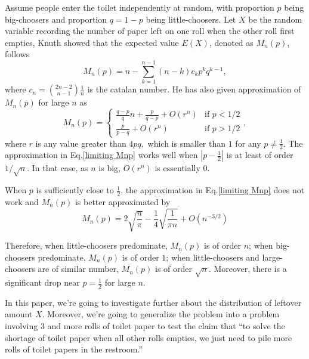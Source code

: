 \documentclass{article}
\begin{document}
Assume people enter the toilet independently at random, with proportion $p$ being big-choosers and proportion $q=1-p$ being little-choosers. Let $X$ be the random variable recording the number of paper left on one roll when the other roll first empties, Knuth showed that the expected value $E(X)$, denoted as $M_n(p)$, follows
\begin{equation}
    M_n(p) = n-\sum_{k=1}^{n-1} (n-k)c_k p^k q^{k-1}, 
    \label{Mnp}
\end{equation}
where $c_n = \binom{2n-2}{n-1}\frac{1}{n}$ is the catalan number. He has also given approximation of $M_n(p)$ for large $n$ as 
\begin{equation}
    M_n(p)=
    \begin{cases}
        \frac{q-p}{q}n+\frac{p}{q-p}+O(r^n) & \text{if }  p<1/2 \\
        \frac{p}{p-q} + O(r^n) & \text{if } p>1/2
    \end{cases}
    ,
    \label{limiting Mnp}
\end{equation}
where $r$ is any value greater than $4pq,$ which is smaller than $1$ for any $p \neq \frac{1}{2}$. The approximation in Eq.\eqref{limiting Mnp} works well when $|p-\frac{1}{2}|$ is at least of order $1/\sqrt{n}$. In that case, as $n$ is big, $O(r^n)$ is essentially 0. 

When $p$ is sufficiently close to $\frac{1}{2}$, the approximation in Eq.\eqref{limiting Mnp} does not work and $M_n(p)$ is better approximated by 
\begin{equation}
    M_n(p)=
    2\sqrt{\frac{n}{\pi}} - \frac{1}{4} \sqrt{\frac{1}{\pi n}} + O(n^{-3/2})
    \label{limiting Mnp equal}
\end{equation}

Therefore, when little-choosers predominate, $M_n(p)$ is of order $n$; when big-choosers predominate, $M_n(p)$ is of order $1$; when little-choosers and large-choosers are of similar number, $M_n(p)$ is of order $\sqrt{n}$. Moreover, there is a significant drop near $p=\frac{1}{2}$ for large $n$. 

In this paper, we're going to investigate further about the distribution of leftover amount $X$. Moreover, we're going to generalize the problem into a problem involving 3 and more rolls of toilet paper to test the claim that ``to solve the shortage of toilet paper when all other rolls empties, we just need to pile more rolls of toilet papers in the restroom.''
\end{document}
